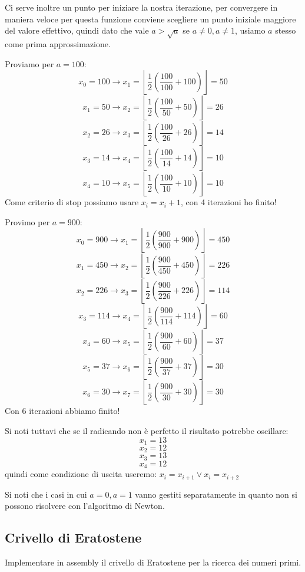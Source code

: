 Ci serve inoltre un punto per iniziare la nostra iterazione, per convergere in maniera veloce per questa funzione conviene scegliere un punto iniziale maggiore del valore effettivo, quindi dato che vale $a > \sqrt{a}$ se $a \neq 0, a \neq 1$, usiamo $a$ stesso come prima approssimazione.

Proviamo per $a = 100$:
$$ x_0 = 100 \xrightarrow{} x_1 = \left\lfloor \frac{1}{2} \left( \frac{100}{100} + 100 \right) \right\rfloor = 50 $$
$$ x_1 = 50 \xrightarrow{} x_2 = \left\lfloor \frac{1}{2} \left( \frac{100}{50} + 50 \right) \right\rfloor = 26 $$
$$ x_2 = 26 \xrightarrow{} x_3 = \left\lfloor \frac{1}{2} \left( \frac{100}{26} + 26 \right) \right\rfloor = 14 $$
$$ x_3 = 14 \xrightarrow{} x_4 = \left\lfloor \frac{1}{2} \left( \frac{100}{14} + 14 \right) \right\rfloor = 10 $$
$$ x_4 = 10 \xrightarrow{} x_5 = \left\lfloor \frac{1}{2} \left( \frac{100}{10} + 10 \right) \right\rfloor = 10 $$
Come criterio di stop possiamo usare $x_i = x_i+1$, con 4 iterazioni ho finito!

Provimo per $a = 900$:
$$ x_0 = 900 \xrightarrow{} x_1 = \left\lfloor \frac{1}{2} \left( \frac{900}{900} + 900 \right) \right\rfloor = 450 $$
$$ x_1 = 450 \xrightarrow{} x_2 = \left\lfloor \frac{1}{2} \left( \frac{900}{450} + 450 \right) \right\rfloor = 226 $$
$$ x_2 = 226 \xrightarrow{} x_3 = \left\lfloor \frac{1}{2} \left( \frac{900}{226} + 226 \right) \right\rfloor = 114 $$
$$ x_3 = 114 \xrightarrow{} x_4 = \left\lfloor \frac{1}{2} \left( \frac{900}{114} + 114 \right) \right\rfloor = 60 $$
$$ x_4 = 60 \xrightarrow{} x_5 = \left\lfloor \frac{1}{2} \left( \frac{900}{60} + 60 \right) \right\rfloor = 37 $$
$$ x_5 = 37 \xrightarrow{} x_6 = \left\lfloor \frac{1}{2} \left( \frac{900}{37} + 37 \right) \right\rfloor = 30 $$
$$ x_6 = 30 \xrightarrow{} x_7 = \left\lfloor \frac{1}{2} \left( \frac{900}{30} + 30 \right) \right\rfloor = 30 $$
Con 6 iterazioni abbiamo finito!

Si noti tuttavi che se il radicando non è perfetto il risultato potrebbe oscillare:
$$ x_1 = 13 $$
$$ x_2 = 12 $$
$$ x_3 = 13 $$
$$ x_4 = 12 $$
quindi come condizione di uscita useremo: $ x_i = x_{i+1} \vee x_i = x_{i+2} $

Si noti che i casi in cui $a = 0, a = 1$ vanno gestiti separatamente in quanto non si possono risolvere con l'algoritmo di Newton.

\subsection{Crivello di Eratostene}
Implementare in assembly il crivello di Eratostene per la ricerca dei numeri primi.

